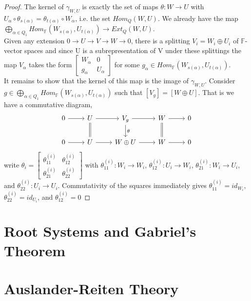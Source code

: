 \documentclass{book}
\begin{document}
		\begin{proof}
			The kernel of $\gamma_{W,U}$ is exactly the set of maps $\theta :W \rightarrow U$ with $U_{\alpha} \circ \theta_{s(\alpha)} = \theta_{t(\alpha)} \circ W_{\alpha}$, i.e. the set $Hom_Q(W,U)$. We already have the map $\bigoplus_{\alpha \in Q_{1}} Hom_{\mathbb{F}} (W_{s(\alpha)},U_{t(\alpha)}) \rightarrow Ext_Q(W,U)$. \\ Given any extension $0 \rightarrow U \rightarrow V \rightarrow W \rightarrow 0$, there is a splitting $V_i= W_i \oplus U_i$ of $\mathbb{F}$-vector spaces and since U is a subrepresentation of V under these splittings the map $V_{\alpha}$ takes the form $\begin{bmatrix}W_{\alpha} & 0\\ g_{\alpha} & U_{\alpha} \end{bmatrix}$ for some $g_{\alpha} \in Hom_{\mathbb{F}}(W_{s(\alpha)}, U_{t(\alpha)}).$ \\ It remains to show that the kernel of this map is the image of $\gamma_{W,U}$. Consider $g \in \bigoplus_{\alpha \in Q_1} Hom_{\mathbb{F}}(W_{s(\alpha)},U_{t(\alpha)})$ such that $[V_g]=[W\oplus U]$. That is we have a commutative diagram,
		\[ \begin{tikzcd}
			0 \arrow{r} & U \arrow[equal]{d} \arrow{r}& V_g \arrow{r}\arrow{d}{\theta} & W  \arrow[equal]{d} \arrow{r} & 0 \\
			0 \arrow{r} & U \arrow{r} & W\oplus U \arrow{r} & W \arrow{r}& 0 
			\end{tikzcd}\]
write $\theta_i =\begin{bmatrix} \theta_{11}^{(i)} & \theta_{12}^{(i)}\\ \theta_{21}^{(i)} &\theta_{22}^{(i)} \end{bmatrix}$ with $\theta_{11}^{(i)}:W_i \rightarrow W_i$, $\theta_{12}^{(i)}:U_i \rightarrow W_i$, $\theta_{21}^{(i)}:W_i \rightarrow U_i$, and $\theta_{22}^{(i)}:U_i \rightarrow U_i$. Commutativity of the squares immediately gives $\theta_{11}^{(i)}=id_{W_i}$, $\theta_{22}^{(i)}=id_{U_i}$, and $\theta_{12}^{(i)}=0$
		\end{proof}

  \section{Root Systems and Gabriel's Theorem}

  \section{Auslander-Reiten Theory}
\end{document}
